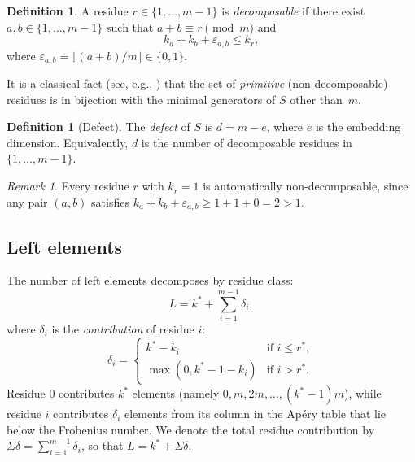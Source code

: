 \documentclass[11pt]{amsart}
\theoremstyle{definition}
\newtheorem{definition}[theorem]{Definition}
\theoremstyle{remark}
\newtheorem{remark}[theorem]{Remark}
\begin{document}
\begin{definition}\label{def:decomposable}
A residue $r \in \{1, \ldots, m-1\}$ is \emph{decomposable} if there exist
$a, b \in \{1, \ldots, m-1\}$ such that $a + b \equiv r \pmod{m}$ and
\begin{equation}\label{eq:decomp}
  k_a + k_b + \varepsilon_{a,b} \le k_r,
\end{equation}
where $\varepsilon_{a,b} = \lfloor (a + b)/m \rfloor \in \{0, 1\}$.
\end{definition}

It is a classical fact (see, e.g., \cite{Eliahou2020}) that the set of
\emph{primitive} (non-decomposable) residues is in bijection with the minimal
generators of $S$ other than~$m$.

\begin{definition}[Defect]\label{def:defect}
The \emph{defect} of $S$ is $d = m - e$, where $e$ is the embedding dimension.
Equivalently, $d$ is the number of decomposable residues in
$\{1, \ldots, m-1\}$.
\end{definition}

\begin{remark}\label{rem:level1}
Every residue $r$ with $k_r = 1$ is automatically non-decomposable, since
any pair $(a, b)$ satisfies $k_a + k_b + \varepsilon_{a,b} \ge 1 + 1 + 0 = 2 > 1$.
\end{remark}

\subsection{Left elements}

The number of left elements decomposes by residue class:
\begin{equation}\label{eq:L-decomp}
  L = k^* + \sum_{i=1}^{m-1} \delta_i,
\end{equation}
where $\delta_i$ is the \emph{contribution} of residue $i$:
\begin{equation}\label{eq:delta}
  \delta_i =
  \begin{cases}
    k^* - k_i & \text{if } i \le r^*, \\
    \max(0, k^* - 1 - k_i) & \text{if } i > r^*.
  \end{cases}
\end{equation}
Residue $0$ contributes $k^*$ elements (namely $0, m, 2m, \ldots, (k^*-1)m$),
while residue $i$ contributes $\delta_i$ elements from its column in the
Ap\'ery table that lie below the Frobenius number.
We denote the total residue contribution by $\Sigma\delta = \sum_{i=1}^{m-1} \delta_i$,
so that $L = k^* + \Sigma\delta$.
\end{document}
